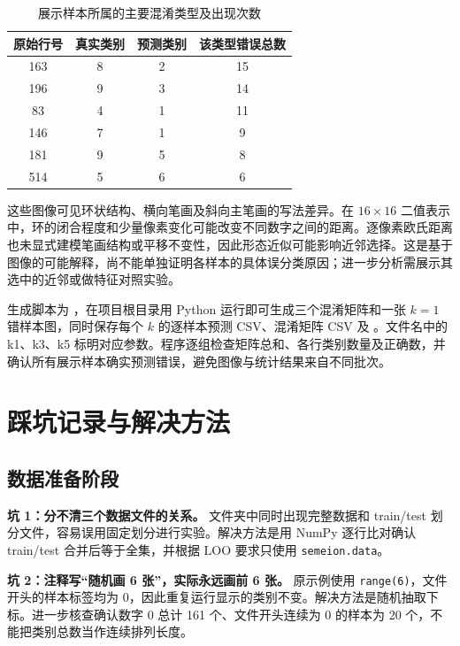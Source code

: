 \documentclass[UTF8,zihao=-4]{ctexart}
\begin{document}
\begin{table}[H]
  \centering
  \caption{展示样本所属的主要混淆类型及出现次数}
  \label{tab:error-pairs}
  \begin{tabular}{cccc}
    \toprule
    原始行号 & 真实类别 & 预测类别 & 该类型错误总数 \\
    \midrule
    163 & 8 & 2 & 15 \\
    196 & 9 & 3 & 14 \\
    83 & 4 & 1 & 11 \\
    146 & 7 & 1 & 9 \\
    181 & 9 & 5 & 8 \\
    514 & 5 & 6 & 6 \\
    \bottomrule
  \end{tabular}
\end{table}

这些图像可见环状结构、横向笔画及斜向主笔画的写法差异。在 $16\times16$ 二值表示中，环的闭合程度和少量像素变化可能改变不同数字之间的距离。逐像素欧氏距离也未显式建模笔画结构或平移不变性，因此形态近似可能影响近邻选择。这是基于图像的可能解释，尚不能单独证明各样本的具体误分类原因；进一步分析需展示其选中的近邻或做特征对照实验。

生成脚本为 ，在项目根目录用 Python 运行即可生成三个混淆矩阵和一张 $k=1$ 错样本图，同时保存每个 $k$ 的逐样本预测 CSV、混淆矩阵 CSV 及 。文件名中的 k1、k3、k5 标明对应参数。程序逐组检查矩阵总和、各行类别数量及正确数，并确认所有展示样本确实预测错误，避免图像与统计结果来自不同批次。

\section{踩坑记录与解决方法}

\subsection{数据准备阶段}

\textbf{坑 1：分不清三个数据文件的关系。} 文件夹中同时出现完整数据和 train/test 划分文件，容易误用固定划分进行实验。解决方法是用 NumPy 逐行比对确认 train/test 合并后等于全集，并根据 LOO 要求只使用 \texttt{semeion.data}。

\textbf{坑 2：注释写“随机画 6 张”，实际永远画前 6 张。} 原示例使用 \texttt{range(6)}，文件开头的样本标签均为 0，因此重复运行显示的类别不变。解决方法是随机抽取下标。进一步核查确认数字 0 总计 161 个、文件开头连续为 0 的样本为 20 个，不能把类别总数当作连续排列长度。
\end{document}
